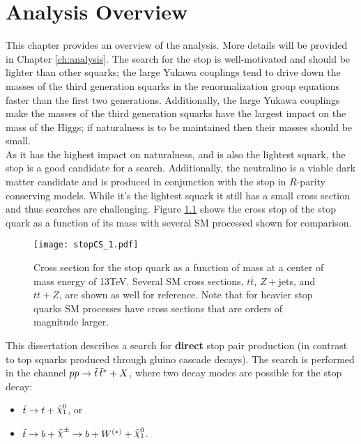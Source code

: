 \chapter{Analysis Overview}
\label{ch:analysisOverview}


This chapter provides an overview of the analysis.  More details will be provided in Chapter \ref{ch:analysis}.  The search for the stop is well-motivated and should be lighter than other squarks; the large Yukawa couplings tend to drive down the masses of the third generation squarks in the renormalization group equations faster than the first two generations.  Additionally, the large Yukawa couplings make the masses of the third generation squarks have the largest impact on the mass of the Higgs; if naturalness is to be maintained then their masses should be small.  \\

As it has the highest impact on naturalness, and is also the lightest squark, the stop is a good candidate for a search.  Additionally, the neutralino is a viable dark matter candidate and is produced in conjunction with the stop in $R$-parity conserving models.  While it's the lightest squark it still has a small cross section and thus searches are challenging.  Figure \ref{fig:stopCS} shows the cross stop of the stop quark as a function of its mass with several SM processed shown for comparison.  \\%


\begin{figure}[tbh]
	\centering
	\texttt{[image: stopCS\_1.pdf]}
	\caption{\label{fig:stopCS}{Cross section for the stop quark as a function of mass at a center of mass energy of 13TeV.  Several SM cross sections, $t\bar{t}$, $Z+$jets\cite{ttZcs}, and $tt+Z$\cite{ttZcs}, are shown as well for reference.  Note that for heavier stop quarks SM processes have cross sections that are orders of magnitude larger.}}
\end{figure}

This dissertation describes a search for {\bf direct} stop pair production (in
contrast to top squarks produced through gluino cascade decays). %
The search is performed in the channel
$pp \rightarrow \tilde{t}\, {\tilde{t}}^{\ast} + X$, where two decay modes are
possible for the stop decay:

\begin{itemize}
\item $\stop \rightarrow t + \ninoone$, or
\item  $\stop \rightarrow b + \chinopm \rightarrow b + W^{(\ast)} + \ninoone$.
\end{itemize}


